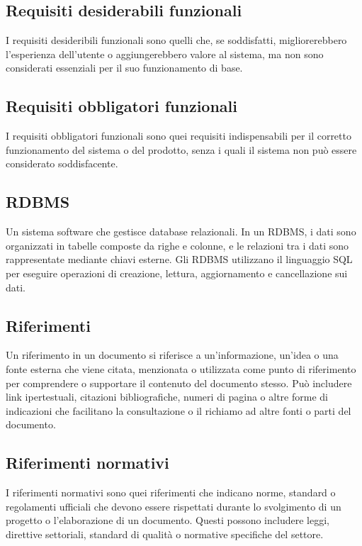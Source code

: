 \subsection*{Requisiti desiderabili funzionali} 
I requisiti desideribili funzionali sono quelli che, se soddisfatti, migliorerebbero l'esperienza dell'utente o aggiungerebbero valore al sistema, ma non sono considerati essenziali per il suo funzionamento di base. 
\subsection*{Requisiti obbligatori funzionali} 
I requisiti obbligatori funzionali sono quei requisiti indispensabili per il corretto funzionamento del sistema o del prodotto, senza i quali il sistema non può essere considerato soddisfacente. 
\subsection*{RDBMS} 
Un sistema software che gestisce database relazionali. In un RDBMS, i dati sono organizzati in tabelle composte da righe e colonne, e le relazioni tra i dati sono rappresentate mediante chiavi esterne. Gli RDBMS utilizzano il linguaggio SQL per eseguire operazioni di creazione, lettura, aggiornamento e cancellazione sui dati. 
\subsection*{Riferimenti} 
Un riferimento in un documento si riferisce a un'informazione, un'idea o una fonte esterna che viene citata, menzionata o utilizzata come punto di riferimento per comprendere o supportare il contenuto del documento stesso. Può includere link ipertestuali, citazioni bibliografiche, numeri di pagina o altre forme di indicazioni che facilitano la consultazione o il richiamo ad altre fonti o parti del documento. 
\subsection*{Riferimenti normativi} 
I riferimenti normativi sono quei riferimenti che indicano norme, standard o regolamenti ufficiali che devono essere rispettati durante lo svolgimento di un progetto o l'elaborazione di un documento. Questi possono includere leggi, direttive settoriali, standard di qualità o normative specifiche del settore.
